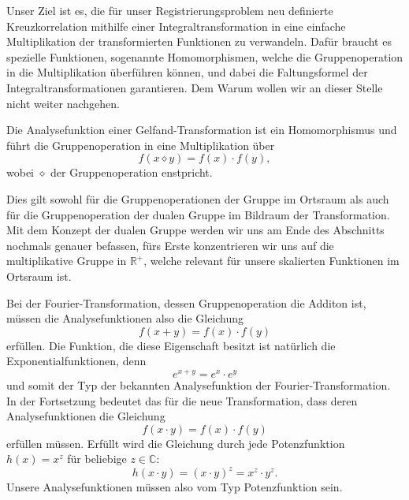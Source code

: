 Unser Ziel ist es, die für unser Registrierungsproblem neu definierte 
Kreuzkorrelation mithilfe einer Integraltransformation in eine 
einfache Multiplikation der transformierten Funktionen zu verwandeln.
Dafür braucht es spezielle Funktionen, sogenannte Homomorphismen, 
%
welche die Gruppenoperation in die Multiplikation überführen können, 
und dabei die Faltungsformel der Integraltransformationen garantieren.
Dem Warum wollen wir an dieser Stelle nicht weiter nachgehen.
\begin{satz}
    Die Analysefunktion einer Gelfand-Transformation ist ein 
    Homomorphismus und führt die Gruppenoperation in eine 
    Multiplikation über
    \[
        f(x \diamond y) 
        = f(x) \cdot f(y)
        ,
    \]
    wobei $\diamond$ der Gruppenoperation enstpricht.
\end{satz}
Dies gilt sowohl für die Gruppenoperationen der Gruppe im Ortsraum 
als auch für die Gruppenoperation der dualen Gruppe im Bildraum der 
Transformation.
Mit dem Konzept der dualen Gruppe werden wir uns am Ende des 
Abschnitts nochmals genauer befassen, fürs Erste konzentrieren wir 
uns auf die multiplikative Gruppe in $\mathbb{R^+}$, welche relevant 
für unsere skalierten Funktionen im Ortsraum ist.

Bei der Fourier-Transformation, dessen Gruppenoperation die Additon 
ist, müssen die Analysefunktionen also die Gleichung 
\begin{equation}
    f(x + y) 
    = f(x) \cdot f(y)
    \label{mellin:hom1}
\end{equation}
erfüllen. 
Die Funktion, die diese Eigenschaft besitzt ist natürlich die 
Exponentialfunktionen, denn 
\begin{equation}
    e^{x + y} 
    = e^x \cdot e^y
    \label{mellin:exp}
\end{equation}
und somit der Typ der bekannten Analysefunktion der 
Fourier-Transformation.
In der Fortsetzung bedeutet das für die neue Transformation, dass 
deren Analysefunktionen die Gleichung
\begin{equation}
    f(x \cdot y) 
    = f(x) \cdot f(y)
    \label{mellin:hom2}
\end{equation}
erfüllen müssen.
Erfüllt wird die Gleichung durch jede Potenzfunktion $h(x) = x^{z}$ 
für beliebige $z \in \mathbb{C}$:
\begin{equation}
    h(x \cdot y) 
    = (x \cdot y)^{z} = x^{z} \cdot y^{z}
    .
\end{equation}
Unsere Analysefunktionen müssen also vom Typ Potenzfunktion sein.

